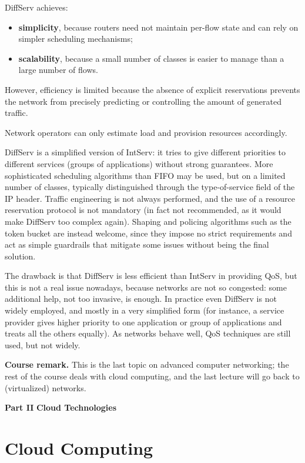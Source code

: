 \documentclass[11pt,a4paper,openany]{report}
\begin{document}
DiffServ achieves:

\begin{itemize}
\item \textbf{simplicity}, because routers need not maintain per-flow state and can rely on simpler scheduling mechanisms;
\item \textbf{scalability}, because a small number of classes is easier to manage than a large number of flows.
\end{itemize}

However, efficiency is limited because the absence of explicit reservations prevents the network from precisely predicting or controlling the amount of generated traffic.

Network operators can only estimate load and provision resources accordingly.

DiffServ is a simplified version of IntServ: it tries to give different priorities to different services (groups of applications) without strong guarantees. More sophisticated scheduling algorithms than FIFO may be used, but on a limited number of classes, typically distinguished through the type-of-service field of the IP header. Traffic engineering is not always performed, and the use of a resource reservation protocol is not mandatory (in fact not recommended, as it would make DiffServ too complex again). Shaping and policing algorithms such as the token bucket are instead welcome, since they impose no strict requirements and act as simple guardrails that mitigate some issues without being the final solution.

The drawback is that DiffServ is less efficient than IntServ in providing QoS, but this is not a real issue nowadays, because networks are not so congested: some additional help, not too invasive, is enough. In practice even DiffServ is not widely employed, and mostly in a very simplified form (for instance, a service provider gives higher priority to one application or group of applications and treats all the others equally). As networks behave well, QoS techniques are still used, but not widely.

\begin{notebox}
	\textbf{Course remark.} This is the last topic on advanced computer networking; the rest of the course deals with cloud computing, and the last lecture will go back to (virtualized) networks.
\end{notebox}

\textbf{Part II} \textbf{Cloud Technologies}

\chapter{Cloud Computing}
\end{document}
